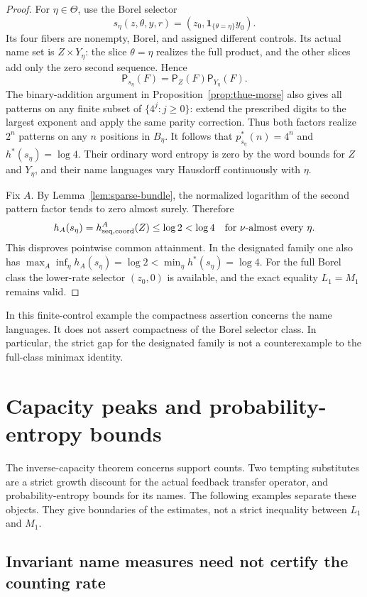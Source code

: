 \documentclass[11pt,reqno]{amsart}
\numberwithin{equation}{section}
\theoremstyle{definition}
\newcommand{\Patt}{\mathsf P}
\newcommand{\one}{\mathbf 1}
\begin{document}
\begin{proof}
For $\eta\in\Theta$, use the Borel selector
\[
 s_\eta(z,\theta,y,r)=(z_0,\one_{\{\theta=\eta\}}y_0).
\]
Its four fibers are nonempty, Borel, and assigned different
controls. Its actual name set is $Z\times Y_\eta$:
the slice $\theta=\eta$ realizes the full product, and the
other slices add only the zero second sequence. Hence
\[
 \Patt_{s_\eta}(F)=\Patt_Z(F)\Patt_{Y_\eta}(F).
\]
The binary-addition argument in Proposition~\ref{prop:thue-morse}
also gives all patterns on any finite subset of
$\{4^j:j\ge0\}$: extend the prescribed digits to the largest
exponent and apply the same parity correction. Thus both factors
realize $2^n$ patterns on any $n$ positions in $B_\eta$.
It follows that $p_{s_\eta}^*(n)=4^n$ and $h^*(s_\eta)=\log4$.
Their ordinary word entropy is zero by the word bounds for
$Z$ and $Y_\eta$, and their name languages vary Hausdorff
continuously with $\eta$.

Fix $A$. By Lemma~\ref{lem:sparse-bundle}, the normalized
logarithm of the second pattern factor tends to zero almost
surely. Therefore
\[
 h_A(s_\eta)=h_{\rm seq,coord}^A(Z)\le\log2<\log4
 \quad\text{for }\nu\text{-almost every }\eta.
\]
This disproves pointwise common attainment. In the designated
family one also has
$\max_A\inf_\eta h_A(s_\eta)=\log2<\min_\eta h^*(s_\eta)=\log4$.
For the full Borel class the lower-rate selector $(z_0,0)$
is available, and the exact equality $L_1=M_1$ remains valid.
\end{proof}

In this finite-control example the compactness assertion concerns
the name languages. It does not assert compactness of the Borel
selector class. In particular, the strict gap for the designated
family is not a counterexample to the full-class minimax identity.

\section{Capacity peaks and probability-entropy bounds}
\label{app:capacity-boundaries}

The inverse-capacity theorem concerns support counts. Two tempting
substitutes are a strict growth discount for the actual feedback
transfer operator, and probability-entropy bounds for its names.
The following examples separate these objects. They give boundaries
of the estimates, not a strict inequality between $L_1$ and $M_1$.

\subsection{Invariant name measures need not certify the counting rate}
\end{document}
